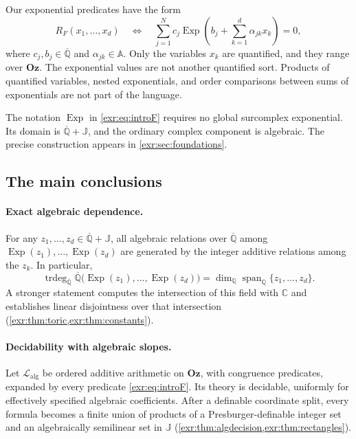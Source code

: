 \documentclass[11pt,letterpaper]{article}
\numberwithin{equation}{section}
\theoremstyle{definition}
\theoremstyle{remark}
\newcommand{\Oz}{\mathbf{Oz}}
\newcommand{\Q}{\mathbb Q}
\newcommand{\C}{\mathbb C}
\newcommand{\A}{\mathbb A}
\newcommand{\Qb}{\overline{\mathbb Q}}
\newcommand{\J}{\mathbb J}
\newcommand{\Lalg}{\mathcal L_{\mathrm{alg}}}
\newcommand{\Exp}{\operatorname{Exp}}
\newcommand{\trdeg}{\operatorname{trdeg}}
\newcommand{\spanQ}{\operatorname{span}_{\Q}}
\begin{document}
Our exponential predicates have the form
\begin{equation}\label{exr:eq:introF}
 R_F(x_1,\ldots,x_d)\quad\Longleftrightarrow\quad
 \sum_{j=1}^{N}c_j\Exp\!\left(b_j+\sum_{k=1}^{d}\alpha_{jk}x_k\right)=0,
\end{equation}
where $c_j,b_j\in\Qb$ and $\alpha_{jk}\in\A$. Only the variables $x_k$ are
quantified, and they range over $\Oz$. The exponential values are not another
quantified sort. Products of quantified variables, nested exponentials, and order
comparisons between sums of exponentials are not part of the language.

The notation $\Exp$ in \eqref{exr:eq:introF} requires no global surcomplex
exponential. Its domain is $\Qb+\J$, and the ordinary complex component is
algebraic. The precise construction appears in \cref{exr:sec:foundations}.

\subsection{The main conclusions}
\paragraph{Exact algebraic dependence.}
For any $z_1,\ldots,z_d\in\Qb+\J$, all algebraic relations over $\Qb$ among
$\Exp(z_1),\ldots,\Exp(z_d)$ are generated by the integer additive relations
among the $z_k$. In particular,
\begin{equation}\label{exr:eq:introtrdeg}
 \trdeg_{\Qb}\Qb\bigl(\Exp(z_1),\ldots,\Exp(z_d)\bigr)
 =\dim_{\Q}\spanQ\{z_1,\ldots,z_d\}.
\end{equation}
A stronger statement computes the intersection of this field with $\C$ and
establishes linear disjointness over that intersection
(\cref{exr:thm:toric,exr:thm:constants}).

\paragraph{Decidability with algebraic slopes.}
Let $\Lalg$ be ordered additive arithmetic on $\Oz$, with congruence predicates,
expanded by every predicate \eqref{exr:eq:introF}. Its theory is decidable, uniformly
for effectively specified algebraic coefficients. After a definable coordinate
split, every formula becomes a finite union of products of a Presburger-definable
integer set and an algebraically semilinear set in $\J$
(\cref{exr:thm:algdecision,exr:thm:rectangles}).
\end{document}
